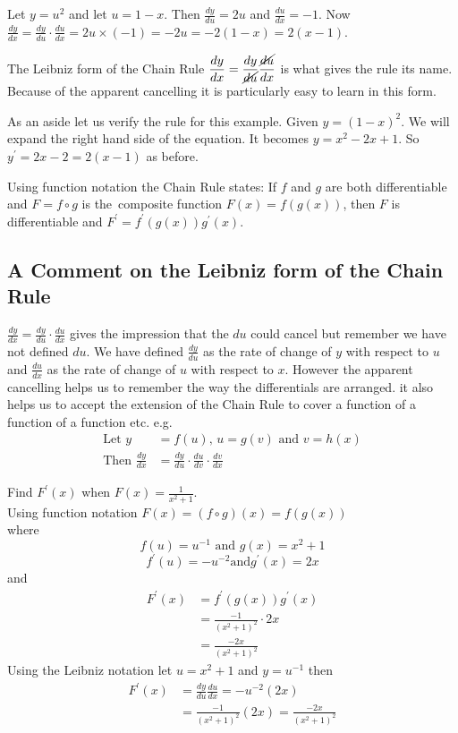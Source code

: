 Let
$y =u^{2}$ and let $u =1 -x$. Then $\frac{d y}{d u} =2 u$ and $\frac{d u}{d x} = -1$. Now $\frac{d y}{d x} =\frac{d y}{d u} \cdot \frac{d u}{d x} =2 u \times ( -1) = -2 u = -2 (1 -x) =2 (x -1)$.

The Leibniz form of the Chain Rule $\displaystyle \frac{d y}{d x} =\frac{d y}{\cancel{d u}} \frac{\cancel{d u}}{d x}$ is what gives the rule its name. Because of the apparent cancelling it is particularly
easy to learn in this form.

As an aside let us verify the rule for this example. Given
$y =(1 -x)^{2}$. We will expand the right hand side of the equation. It
becomes $y =x^{2} -2 x +1$. So $y^{ \prime } =2 x -2 =2 (x -1)$ as before.

Using function notation the Chain Rule states: If $f$ and $g$ are both differentiable and $F =f \circ g$ is the\ composite function $F (x) =f (g (x))$, then $F$ is differentiable and $F^{ \prime } =f^{ \prime } (g (x)) g^{ \prime } (x)$.

\subsection*{A Comment on the Leibniz form of the Chain Rule}
$\frac{d y}{d x} =\frac{d y}{d u} \cdot \frac{d u}{d x}$ gives the impression that the $d u$ could cancel but remember we have not defined $d u$. We have defined $\frac{d y}{d u}$ as the rate of change of $y$ with respect to $u$ and $\frac{d u}{d x}$ as the rate of change of $u$ with respect to $x$. However the apparent cancelling helps us to remember the way the differentials
are arranged. it also helps us to accept the extension of the Chain Rule to cover a function of a function of
a function etc. e.g.
\begin{align*}\text{Let }y &  = f (u)\text{, }u =g (v)\text{ and }v =h (x) \\
\text{Then }\frac{d y}{d x} &  = \frac{d y}{d u} \cdot \frac{d u}{d v} \cdot \frac{d v}{d x}\end{align*}

\example Find $F^{ \prime } (x)$ when $F (x) =\frac{1}{x^{2} +1}$. \\
\solution Using function notation $F (x) =\left (f \circ g\right ) (x) =f (g (x))$ \\
where $$f (u) =u^{ -1} \text{ and }g (x) =x^{2} +1$$
\begin{equation*}f^{ \prime } (u) = -u^{ -2}\text{and}g^{ \prime } (x) =2 x
\end{equation*}
and
\begin{align*}F^{ \prime } (x) &  = f^{ \prime } (g (x)) g^{ \prime } (x) \\
 &  = \frac{ -1}{(x^{2} +1)^{2}} \cdot 2 x \\
 &  = \frac{ -2 x}{\left (x^{2} +1\right )^{2}}\end{align*}
Using the Leibniz notation let $u =x^{2} +1$ and $y =u^{ -1}$ then
\begin{align*}F^{ \prime } (x) &  = \frac{d y}{d u} \frac{d u}{d x} = -u^{ -2} \left (2 x\right ) \\
 &  = \frac{ -1}{\left (x^{2} +1\right )^{2}} \left (2 x\right ) =\frac{ -2 x}{\left (x^{2} +1\right )^{2}}\end{align*}

